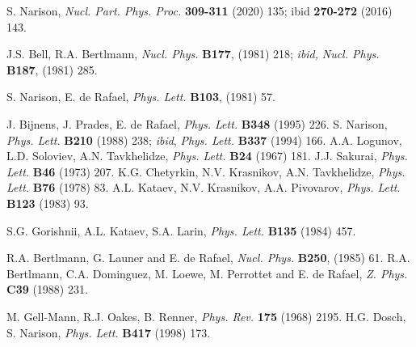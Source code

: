 \begin{thebibliography}{999}
   S. Narison, {\it Nucl. Part. Phys. Proc.} {\bf 309-311} (2020) 135; ibid {\bf 270-272} (2016) 143.

  J.S. Bell, R.A. Bertlmann, {\it Nucl. Phys.} {\bf B177}, (1981) 218;
{\it ibid,} {\it Nucl. Phys.} {\bf B187}, (1981) 285.
 
S. Narison, E. de Rafael,  {\it Phys. Lett.} {\bf B103},  (1981) 57.



  J. Bijnens, J. Prades, E. de Rafael, {\it Phys. Lett.} {\bf B348} (1995) 226.
 S. Narison, {\it Phys. Lett.} {\bf B210} (1988) 238; {\it ibid}, {\it Phys. Lett.} {\bf B337} (1994) 166.
  A.A. Logunov, L.D. Soloviev, A.N. Tavkhelidze,  {\it Phys. Lett.} {\bf B24} (1967) 181.
 J.J. Sakurai, {\it Phys. Lett.} {\bf B46} (1973) 207.
  K.G. Chetyrkin, N.V. Krasnikov, A.N. Tavkhelidze,  {\it Phys. Lett.} {\bf B76} (1978) 83.
  A.L. Kataev, N.V. Krasnikov, A.A. Pivovarov,  {\it Phys. Lett.} {\bf B123} (1983)  93.
 
  S.G. Gorishnii, A.L. Kataev, S.A. Larin, {\it Phys. Lett.} {\bf B135} (1984)  457.

R.A. Bertlmann, G. Launer and E. de Rafael, {\it Nucl. Phys.} {\bf B250}, (1985) 61.
 R.A. Bertlmann, C.A. Dominguez, M. Loewe, M. Perrottet and E. de Rafael, {\it Z. Phys.} {\bf C39} (1988) 231.


  M. Gell-Mann, R.J. Oakes, B. Renner, {\it Phys. Rev.} {\bf 175} (1968) 2195.
 H.G. Dosch, S. Narison, {\it Phys. Lett.} {\bf B417} (1998) 173. 



\end{thebibliography}
